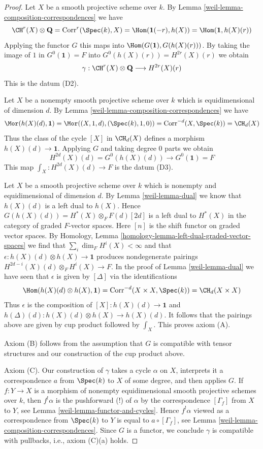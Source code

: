 \begin{proof}
\medskip\noindent
Let $X$ be a smooth projective scheme over $k$. By
Lemma \ref{weil-lemma-composition-correspondences} we have
$$
\CH^r(X) \otimes \mathbf{Q} = \text{Corr}^r(\Spec(k), X) =
\Hom(\mathbf{1}(-r), h(X)) = \Hom(\mathbf{1}, h(X)(r))
$$
Applying the functor $G$ this maps into
$\Hom(G(\mathbf{1}), G(h(X)(r)))$.
By taking the image of $1$ in $G^0(\mathbf{1}) = F$
into $G^0(h(X)(r)) = H^{2r}(X)(r)$ we obtain
$$
\gamma :
\CH^r(X) \otimes \mathbf{Q} \longrightarrow H^{2r}(X)(r)
$$
This is the datum (D2).

\medskip\noindent
Let $X$ be a nonempty smooth projective scheme over $k$
which is equidimensional of dimension $d$. By
Lemma \ref{weil-lemma-composition-correspondences} we have
$$
\Mor(h(X)(d), \mathbf{1}) = \Mor((X, 1, d), (\Spec(k), 1, 0)) =
\text{Corr}^{-d}(X, \Spec(k)) = \CH_d(X)
$$
Thus the class of the cycle $[X]$ in $\CH_d(X)$ defines a morphism
$h(X)(d) \to \mathbf{1}$. Applying $G$ and taking degree $0$
parts we obtain
$$
H^{2d}(X)(d) = G^0(h(X)(d)) \longrightarrow G^0(\mathbf{1}) = F
$$
This map $\int_X : H^{2d}(X)(d) \to F$ is the datum (D3).

\medskip\noindent
Let $X$ be a smooth projective scheme over $k$ which is
nonempty and equidimensional of dimension $d$. By Lemma \ref{weil-lemma-dual}
we know that $h(X)(d)$ is a left dual to $h(X)$. Hence
$G(h(X)(d)) = H^*(X) \otimes_F F(d)[2d]$
is a left dual to $H^*(X)$ in the category of graded $F$-vector spaces.
Here $[n]$ is the shift functor on graded vector spaces.
By Homology, Lemma \ref{homology-lemma-left-dual-graded-vector-spaces}
we find that $\sum_i \dim_F H^i(X) < \infty$ and that
$\epsilon : h(X)(d) \otimes h(X) \to \mathbf{1}$ produces
nondegenerate pairings $H^{2d - i}(X)(d) \otimes_F H^i(X) \to F$.
In the proof of Lemma \ref{weil-lemma-dual} we have seen that
$\epsilon$ is given by $[\Delta]$ via the identifications
$$
\Hom(h(X)(d) \otimes h(X), \mathbf{1}) =
\text{Corr}^{-d}(X \times X, \Spec(k)) =
\CH_d(X \times X)
$$
Thus $\epsilon$ is the composition of $[X] : h(X)(d) \to \mathbf{1}$
and $h(\Delta)(d) : h(X)(d) \otimes h(X) \to h(X)(d)$. It follows
that the pairings above are given by cup product followed by
$\int_X$. This proves axiom (A).

\medskip\noindent
Axiom (B) follows from the assumption that $G$ is compatible
with tensor structures and our construction of the cup product above.

\medskip\noindent
Axiom (C). Our construction of $\gamma$ takes a cycle $\alpha$ on $X$,
interprets it a correspondence $a$ from $\Spec(k)$ to $X$ of some degree,
and then applies $G$. If $f : Y \to X$ is a morphism of nonempty
equidimensional smooth projective schemes over $k$, then
$f^!\alpha$ is the pushforward (!) of $\alpha$
by the correspondence $[\Gamma_f]$ from $X$ to $Y$, see
Lemma \ref{weil-lemma-functor-and-cycles}. Hence
$f^!\alpha$ viewed as a correspondence from $\Spec(k)$ to $Y$
is equal to $a \circ [\Gamma_f]$, see
Lemma \ref{weil-lemma-composition-correspondences}.
Since $G$ is a functor, we conclude
$\gamma$ is compatible with pullbacks, i.e., axiom (C)(a) holds.


\end{proof}
